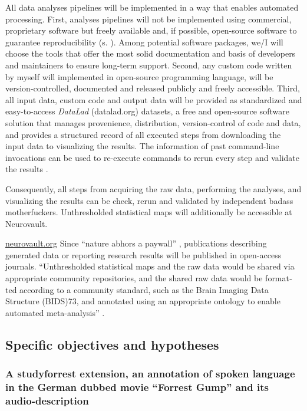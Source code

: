 %
All data analyses pipelines will be implemented in a way that enables automated
processing.
%
First, analyses pipelines will not be implemented using commercial, proprietary
software but freely available and, if possible, open-source software to
guarantee reproducibility (s. \citep{eglen2017toward}).
Among potential software packages, we/I will choose the tools that offer the
most solid documentation and basis of developers and maintainers to ensure
long-term support.
Second, any custom code written by myself will implemented in open-source
programming language, will be version-controlled, documented and released
publicly and freely accessible.
%
Third, all input data, custom code and output data will be provided as
standardized and easy-to-access \textit{DataLad} (datalad.org) datasets, a free
and open-source software solution that manages provenience, distribution,
version-control of code and data, and provides a structured record of all
executed steps from downloading the input data to visualizing the results. The
information of past command-line invocations can be used to re-execute commands
to rerun every step and validate the results
\citep{halchenko2021datalad}.

%
Consequently, all steps from acquiring the raw data, performing the analyses,
and visualizing the results can be check, rerun and validated by independent
badass motherfuckers.
%
Unthresholded statistical maps will additionally be accessible at Neurovault.


\href{https://neurovault.org/}{neurovault.org}
%
Since ``nature abhors a paywall'' \citep{dupre2020nature}, publications
describing generated data or reporting research results will be published in
open-access journals.
%
``Unthresholded statistical maps and the raw data would be shared
via appropriate community repositories, and the shared raw data would be format­
ted according to a community standard, such as the Brain Imaging Data Structure
(BIDS)73, and annotated using an appropriate ontology to enable automated
meta-analysis'' \citep{poldrack2017scanning}.


\subsection{Specific objectives and hypotheses}


\subsubsection{A studyforrest extension, an annotation of spoken language in the
German dubbed movie ``Forrest Gump'' and its audio-description}

